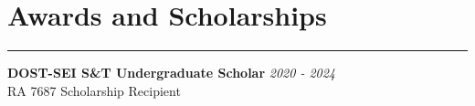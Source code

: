 \documentclass[a4paper, 10pt]{article}
\begin{document}
\vspace{-1em}

\section*{Awards and Scholarships}
\vspace{-1.5em}
\noindent\rule{\textwidth}{0.4pt}
\noindent \textbf{DOST-SEI S\&T Undergraduate Scholar} \hfill \textit{2020 - 2024} \\
RA 7687 Scholarship Recipient
\end{document}
